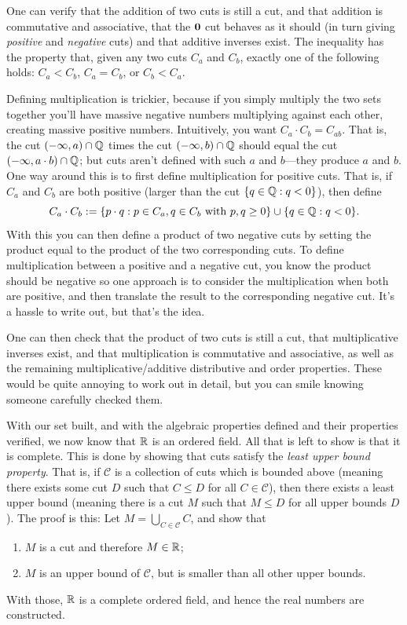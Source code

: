 \begin{proofsketch}
  One can verify that the addition of two cuts is still a cut, and
  that addition is commutative and associative, that the $\textbf{0}$ cut
  behaves as it should (in turn giving \textit{positive} and
  \textit{negative} cuts) and that additive inverses exist. The
  inequality has the property that, given any two cuts $C_a$ and
  $C_b$, exactly one of the following holds: $C_a < C_b$, $C_a =
  C_b$, or $C_b < C_a$.

  Defining multiplication is trickier, because if you simply multiply
  the two sets together you'll have massive negative numbers
  multiplying against each other, creating massive positive numbers.
  Intuitively, you want $C_a \cdot C_b = C_{ab}$. That is, the cut
  $(-\infty, a) \cap \mathbb Q$ times the cut $(-\infty, b) \cap \mathbb Q$
  should equal the cut $(-\infty, a \cdot b) \cap \mathbb Q$; but cuts
  aren't defined with such $a$ and $b$—they produce $a$ and $b$. One
  way around this is to first define multiplication for positive
  cuts. That is, if $C_a$ and $C_b$ are both positive (larger than
  the cut $\{ q \in \mathbb Q : q < 0 \}$), then define
  \[ C_a \cdot C_b := \{ p \cdot q : p \in C_a, q \in C_b \text{
  with } p, q \geq 0 \} \cup \{ q \in \mathbb Q : q < 0 \}. \]
  With this you can then define a product of two negative cuts by
  setting the product equal to the product of the two corresponding
  cuts. To define multiplication between a positive and a negative
  cut, you know the product should be negative so one approach is to
  consider the multiplication when both are positive, and then
  translate the result to the corresponding negative cut. It's a
  hassle to write out, but that's the idea.

  One can then check that the product of two cuts is still a cut,
  that multiplicative inverses exist, and that multiplication is
  commutative and associative, as well as the remaining
  multiplicative/additive distributive and order properties. These
  would be quite annoying to work out in detail, but you can smile
  knowing someone carefully checked them.

  With our set built, and with the algebraic properties defined and
  their properties verified, we now know that $\mathbb R$ is an ordered
  field. All that is left to show is that it is complete. This is
  done by showing that cuts satisfy the \textit{least upper bound
  property}. That is, if $\mathcal{C}$ is a collection of cuts which
  is bounded above (meaning there exists some cut $D$ such that $C
  \leq D$ for all $C \in \mathcal{C}$), then there exists a least
  upper bound (meaning there is a cut $M$ such that $M \leq D$ for
  all upper bounds $D$). The proof is this: Let $M = \bigcup_{C \in
  \mathcal{C}} C$, and show that
  \begin{enumerate}
    \item $M$ is a cut and therefore $M \in \mathbb R$;
    \item $M$ is an upper bound of $\mathcal{C}$, but is smaller than
      all other upper bounds.
  \end{enumerate}
  With those, $\mathbb R$ is a complete ordered field, and hence the real
  numbers are constructed.
\end{proofsketch}

